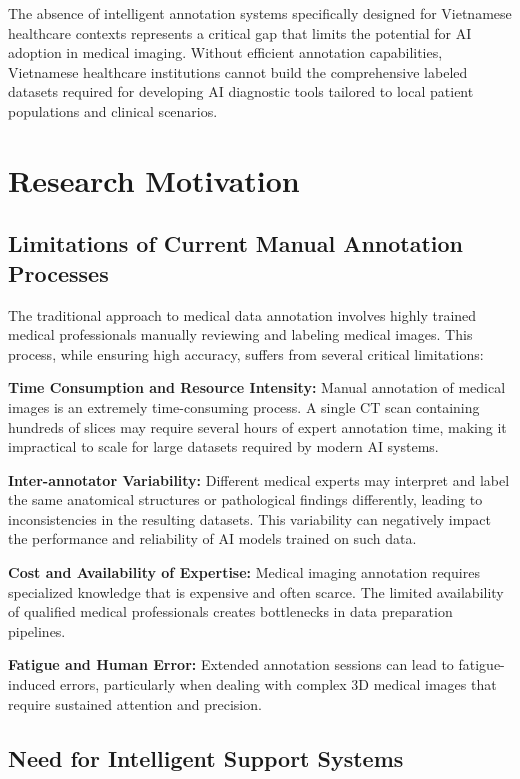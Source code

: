 The absence of intelligent annotation systems specifically designed for Vietnamese healthcare contexts represents a critical gap that limits the potential for AI adoption in medical imaging. Without efficient annotation capabilities, Vietnamese healthcare institutions cannot build the comprehensive labeled datasets required for developing AI diagnostic tools tailored to local patient populations and clinical scenarios.

\section{Research Motivation}

\subsection{Limitations of Current Manual Annotation Processes}

The traditional approach to medical data annotation involves highly trained medical professionals manually reviewing and labeling medical images. This process, while ensuring high accuracy, suffers from several critical limitations:

\textbf{Time Consumption and Resource Intensity:} Manual annotation of medical images is an extremely time-consuming process. A single CT scan containing hundreds of slices may require several hours of expert annotation time, making it impractical to scale for large datasets required by modern AI systems.

\textbf{Inter-annotator Variability:} Different medical experts may interpret and label the same anatomical structures or pathological findings differently, leading to inconsistencies in the resulting datasets. This variability can negatively impact the performance and reliability of AI models trained on such data.

\textbf{Cost and Availability of Expertise:} Medical imaging annotation requires specialized knowledge that is expensive and often scarce. The limited availability of qualified medical professionals creates bottlenecks in data preparation pipelines.

\textbf{Fatigue and Human Error:} Extended annotation sessions can lead to fatigue-induced errors, particularly when dealing with complex 3D medical images that require sustained attention and precision.

\subsection{Need for Intelligent Support Systems}

